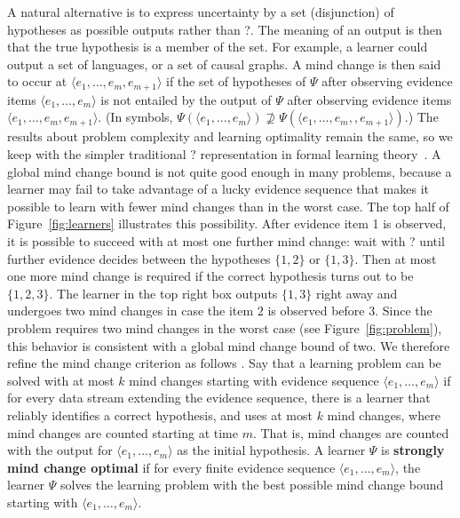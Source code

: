 \documentclass{elsarticle}%
\newcommand{\learnera}{\Psi}
\begin{document}
A natural alternative is to express uncertainty by a set (disjunction) of hypotheses as possible outputs rather than ?. The meaning of an output is then that the true hypothesis is a member of the set. For example, a learner could output a set of languages, or a set of causal graphs. A mind change is then said to occur at $\langle e_{1},\ldots,e_{m},e_{m+1}\rangle$ if the set of hypotheses of $\learnera$ after observing evidence items $\langle e_{1},\ldots,e_{m}\rangle$ is not entailed by the output of $\learnera$ after observing evidence items $\langle e_{1},\ldots,e_{m},e_{m+1}\rangle$. (In symbols, $\learnera(\langle e_{1},\ldots,e_{m}\rangle) \not\supseteq \learnera(\langle e_{1},\ldots,e_{m},,e_{m+1}\rangle)$.) The results about problem complexity and learning optimality remain the same, so we keep with the simpler traditional ? representation in formal learning theory~\cite[Ch.12.2]{jain99:_system_that_learn}.
A global mind change bound is not quite good enough in many problems, because a learner may fail to take advantage of a lucky evidence sequence that makes it possible to learn with fewer mind changes than in the worst case. The top half of Figure~\ref{fig:learners} illustrates this possibility. After evidence item 1 is observed, it is possible to succeed with at most one further mind change: wait with ? until further evidence decides between the hypotheses $\{1,2\}$ or $\{1,3\}$. Then at most one more mind change is required if the correct hypothesis turns out to be $\{1,2,3\}$. The learner in the top right box outputs $\{1,3\}$ right away and undergoes two mind changes in case the item $2$ is observed before $3$. Since the problem requires two mind changes in the worst case (see Figure~\ref{fig:problem}), this behavior is consistent with a global mind change bound of two. We therefore refine the mind change criterion as follows \cite{Schulte2010}. Say that a learning problem can be solved with at most $k$ mind changes starting with evidence sequence $\langle e_{1},\ldots,e_{m}\rangle$ if for every data stream extending the evidence sequence, there is a learner that reliably identifies a correct hypothesis, and uses at most $k$ mind changes, where mind changes are counted starting at time $m$. That is, mind changes are counted with the output for $\langle e_{1},\ldots,e_{m}\rangle$ as the initial hypothesis. A
learner $\learnera$ is \textbf{strongly mind change optimal} if for every finite evidence sequence $\langle e_{1},\ldots,e_{m}\rangle$, the learner $\learnera$ solves the learning problem with the best possible mind change bound starting with $\langle e_{1},\ldots,e_{m}\rangle$.
\end{document}

